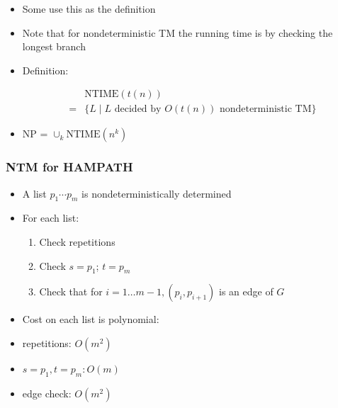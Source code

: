 \begin{frame}[allowframebreaks]
\begin{itemize}
\item Some use this as the definition

\item Note that for nondeterministic TM the running time is by checking the longest branch

\item Definition:

  \begin{equation*}
    \begin{split}
      & \text{NTIME}(t(n)) \\
      =& \{L\mid L
\text{ decided by } O(t(n))
\text{ nondeterministic TM}\}
\end{split}
\end{equation*}
\item NP = $\cup_k \text{NTIME}(n^k)$

\end{itemize}\end{frame} \begin{frame}[allowframebreaks] \frametitle{NTM for HAMPATH}
  \begin{itemize}
\item A list $p_1\cdots p_m$ is nondeterministically determined

\item For each list:

  \begin{enumerate}
  \item  Check repetitions
  \item Check $s=p_1$; $t=p_m$
\item Check that for $i=1 \ldots m-1, (p_i, p_{i+1})$ is an edge of $G$
  \end{enumerate}
\item Cost on each list is polynomial:

  
\item [] repetitions: $O(m^2)$

\item [] $s=p_1, t = p_m: O(m)$

\item [] edge check: $O(m^2)$

\end{itemize}\end{frame}


